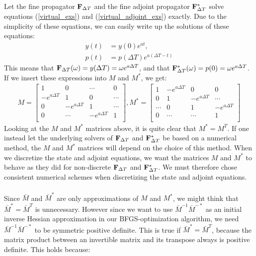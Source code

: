 \documentclass[11pt,a4paper]{article}
\begin{document}
\\
\\
Let the fine propagator $\bold F_{\Delta T}$ and the fine adjoint propagator $\bold F_{\Delta T}^*$ solve equations (\ref{virtual_exs}) and (\ref{virtual_adjoint_exs}) exactly. Due to the simplicity of these equations, we can easily write up the solutions of these equations:
\begin{align}
y(t)&=y(0)e^{at}, \\
p(t)&=p(\Delta T) e^{a(\Delta T-t)}
\end{align} 
This means that $\bold F_{\Delta T}(\omega)=y(\Delta T)=\omega e^{a\Delta T}$, and that $\bold F_{\Delta T}^*(\omega)=p(0)=\omega e^{a\Delta T}$. If we insert these expressions into $M$ and $M^*$, we get:
\begin{align*}
M = \left[ \begin{array}{cccc}
   1 & 0 & \cdots & 0 \\  
   -e^{a\Delta T} & 1 & 0 & \cdots \\ 
   0 &-e^{a\Delta T} & 1  & \cdots \\
   0 &\cdots &-e^{a\Delta T} & 1  \\
   \end{array}  \right],
M^* =\left[ \begin{array}{cccc}
   	 1& - e^{a\Delta T} & 0 & 0 \\  
  	 0 & 1 & - e^{a\Delta T} & \cdots \\ 
  	 \cdots &0 &  1 & - e^{a\Delta T} \\
  	 0 &\cdots &\cdots &  1  \\
  	 \end{array}  \right]
\end{align*}
Looking at the $M$ and $M^*$ matrices above, it is quite clear that $M^*=M^T$. If one instead let the underlying solvers of $\bold F_{\Delta T}$ and $\bold F_{\Delta T}^*$ be based on a numerical method, the $M$ and $M^*$ matrices will depend on the choice of this method. When we discretize the state and adjoint equations, we want the matrices $M$ and $M^*$ to behave as they did for non-discrete $\bold F_{\Delta T}$ and $\bold F_{\Delta T}^*$. We must therefore chose consistent numerical schemes when discretizing the state and adjoint equations. 
\\
\\
Since $\bar{M}$ and $\bar{M}^{*}$ are only approximations of $M$ and $M^*$, we might think that $\bar{M}^*=\bar{M}^T$ is unnecessary. However since we want to use $\bar{M}^{-1}\bar{M}^{-*}$ as an initial inverse Hessian approximation in our BFGS-optimization algorithm, we need $\bar{M}^{-1}\bar{M}^{-*}$ to be symmetric positive definite. This is true if $\bar{M}^*=\bar{M}^T$, because the matrix product between an invertible matrix and its transpose always is positive definite. This holds because:
\end{document}
